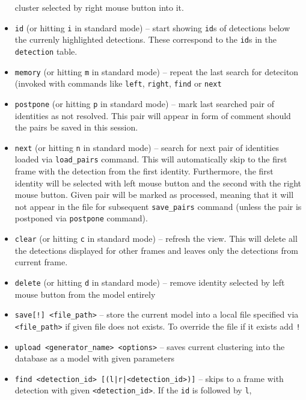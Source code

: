 \begin{itemize}
    cluster selected by right mouse button into it.
    \item \verb+id+ (or hitting \verb+i+ in standard mode) -- start showing \verb+id+s of
    detections below the currenly highlighted detections. These correspond to the \verb+id+s
    in the \texttt{detection} table.
    \item \verb+memory+ (or hitting \verb+m+ in standard mode) -- repeat the last search 
    for deteciton (invoked with commands
    like \verb+left+, \verb+right+, \verb+find+ or \verb+next+
    \item \verb+postpone+ (or hitting \verb+p+ in standard mode) -- mark last searched 
    pair of identities as not resolved. This pair will appear in form of comment should
    the pairs be saved in this session.
    \item \verb+next+ (or hitting \verb+n+ in standard mode) -- search for next pair
    of identities loaded via \verb+load_pairs+ command. This will automatically skip
    to the first frame with the detection from the first identity. Furthermore, the
    first identity will be selected with left mouse button and the second with the
    right mouse button. Given pair will be marked as processed, meaning that it will
    not appear in the file for subsequent \verb+save_pairs+ command (unless the pair
    is postponed via \verb+postpone+ command).
    \item \verb+clear+ (or hitting \verb+c+ in standard mode) -- refresh the view.
    This will delete all the detections displayed for other frames and leaves only
    the detections from current frame.
    \item \verb+delete+ (or hitting \verb+d+ in standard mode) -- remove identity
    selected by left mouse button from the model entirely
    \item \verb+save[!] <file_path>+ -- store the current model into a local file
    specified via \verb+<file_path>+ if given file does not exists. To override the file if it exists add \verb+!+
    \item \verb+upload <generator_name> <options>+ -- saves current clustering into the
    database as a model with given parameters
    \item \verb+find <detection_id> [(l|r|<detection_id>)]+ -- skips to a frame
    with detection with given \verb+<detection_id>+. If the \verb+id+ is followed by \verb+l+,

\end{itemize}
